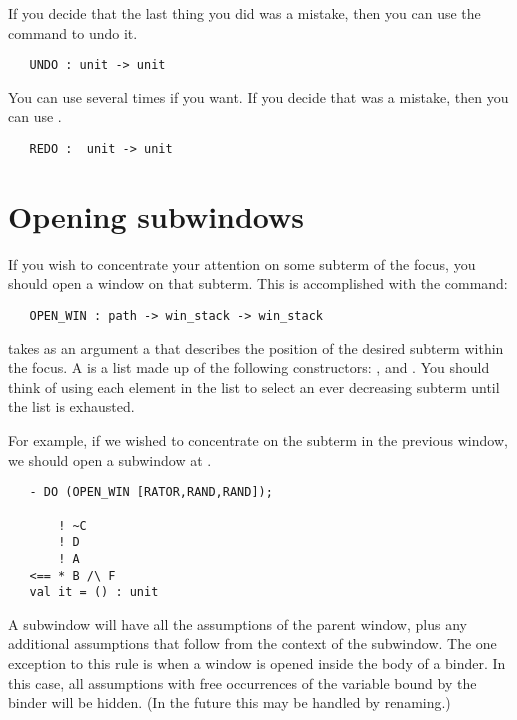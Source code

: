 If you decide that the last thing you did was a mistake,
then you can use the  command to undo it.
\begin{boxed}\begin{verbatim}
   UNDO : unit -> unit
\end{verbatim}\end{boxed}
You can use  several times if you want.
If you decide that  was a mistake, then you can use .
\begin{boxed}\begin{verbatim}
   REDO :  unit -> unit
\end{verbatim}\end{boxed}

\section{Opening subwindows}
If you wish to concentrate your attention on some subterm of the focus,
you should open a window on that subterm.
This is accomplished with the command:
\begin{boxed}\begin{verbatim}
   OPEN_WIN : path -> win_stack -> win_stack
\end{verbatim}\end{boxed}
 takes as an argument a  that describes the
position of the desired subterm within the focus.
A  is a list made up of the following
constructors: ,  and .
You should think of using each element in the list to select
an ever decreasing subterm until the list is exhausted.

For example, if we wished to concentrate on the subterm  in
the previous window, we should open a subwindow at .
\begin{session}\begin{verbatim}
   - DO (OPEN_WIN [RATOR,RAND,RAND]);
   
       ! ~C
       ! D
       ! A
   <== * B /\ F
   val it = () : unit
\end{verbatim}\end{session}

A subwindow will have all the assumptions of the parent window,
plus any additional assumptions that follow from the context of the subwindow.
The one exception to this rule is when a window is opened inside the body of a
binder.
In this case, all assumptions with free occurrences of the variable bound
by the binder will be hidden.
(In the future this may be handled by renaming.)

